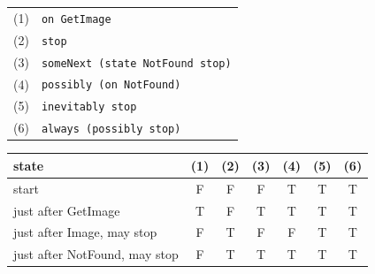 \begin{center}\begin{tabular}{@{}rl@{}}
(1) & \texttt{on GetImage} \\
(2) & \texttt{stop} \\
(3) & \texttt{someNext (state NotFound stop)} \\
(4) & \texttt{possibly (on NotFound)} \\
(5) & \texttt{inevitably stop} \\
(6) & \texttt{always (possibly stop)} \\
\end{tabular}\end{center}
\begin{center}\begin{tabular}{@{}lcccccc@{}}
\toprule
state & (1) & (2) & (3) & (4) & (5) & (6) \\
\midrule
start & F & F & F & T & T & T \\
just after GetImage & T & F & T & T & T & T \\
just after Image, may stop & F & T & F & F & T & T \\
just after NotFound, may stop & F & T & T & T & T & T \\
\bottomrule
\end{tabular}\end{center}
